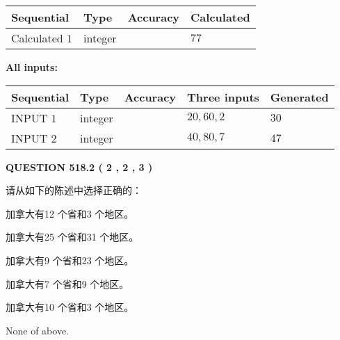 \documentclass{ctexart}
\begin{document}
   
   
   
\noindent{}
   
   
  
  
\noindent\begin{tabular}{|l|l|l|l|}
\hline
 Sequential & Type & Accuracy & Calculated \\ 
\hline
 
 
  Calculated $  1 $ & integer &  & 
  $ 77 $ 
 \\  \hline  
 \end{tabular}
   
   
   
   
\noindent\vspace{0.1in}\hspace{-0.08in} {\textbf{\Large{All inputs: }}}
   
   
  
  
\noindent\begin{tabular}{|l|l|l|l|l|}
\hline
 Sequential & Type & Accuracy & Three inputs & Generated \\ 
\hline
 
 
  INPUT $  1 $ & integer &  & $
 20
 , 
 60
 , 
 2
 $ & $ 30 $ 
 \\  \hline  
 
 
  INPUT $  2 $ & integer &  & $
 40
 , 
 80
 , 
 7
 $ & $ 47 $ 
 \\  \hline  
 \end{tabular}
   
   
  
\vspace{0.2in}
  
{\textbf{\Large{QUESTION
518.2 
 ( 2 , 2 , 3 )
}}}
  
  
请从如下的陈述中选择正确的：
 
 
加拿大有12 个省和3 个地区。
 
 
加拿大有25 个省和31 个地区。
 
 
加拿大有9 个省和23 个地区。
 
 
加拿大有7 个省和9 个地区。
 
 
加拿大有10 个省和3 个地区。
 
 
 None of above.
 
 
\noindent{}
 
\end{document}
